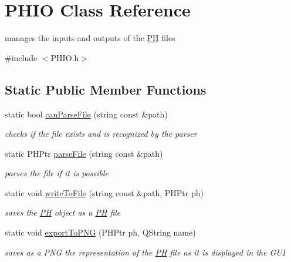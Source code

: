 \hypertarget{class_p_h_i_o}{\section{\-P\-H\-I\-O \-Class \-Reference}
\label{class_p_h_i_o}
}


manages the inputs and outputs of the \hyperlink{class_p_h}{\-P\-H} files  




{\ttfamily \#include $<$\-P\-H\-I\-O.\-h$>$}

\subsection*{\-Static \-Public \-Member \-Functions}
\begin{DoxyCompactItemize}
\item 
static bool \hyperlink{class_p_h_i_o_a264cd5b35169906843e829a13cbcc09d}{can\-Parse\-File} (string const \&path)
\begin{DoxyCompactList}\small\item\em checks if the file exists and is recognized by the parser \end{DoxyCompactList}\item 
static \-P\-H\-Ptr \hyperlink{class_p_h_i_o_afeb84bb5b7960b8a4733b7345d2db025}{parse\-File} (string const \&path)
\begin{DoxyCompactList}\small\item\em parses the file if it is possible \end{DoxyCompactList}\item 
static void \hyperlink{class_p_h_i_o_a8a33a5a439f19caf0619ab7132642846}{write\-To\-File} (string const \&path, \-P\-H\-Ptr ph)
\begin{DoxyCompactList}\small\item\em saves the \hyperlink{class_p_h}{\-P\-H} object as a \hyperlink{class_p_h}{\-P\-H} file \end{DoxyCompactList}\item 
static void \hyperlink{class_p_h_i_o_a612f877c6332f9d20d6ef8992c1681f3}{export\-To\-P\-N\-G} (\-P\-H\-Ptr ph, \-Q\-String name)
\begin{DoxyCompactList}\small\item\em saves as a \-P\-N\-G the representation of the \hyperlink{class_p_h}{\-P\-H} file as it is displayed in the \-G\-U\-I \end{DoxyCompactList}\end{DoxyCompactItemize}


